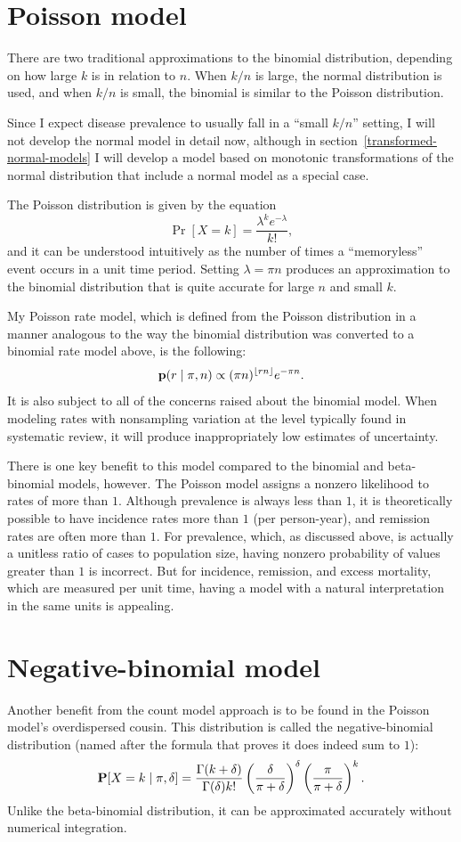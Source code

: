 \section{Poisson model}
There are two traditional approximations to the binomial distribution,
depending on how large $k$ is in relation to $n$.  When $k/n$ is
large, the normal distribution is used, and when $k/n$ is small, the
binomial is similar to the Poisson distribution.

Since I expect disease prevalence to usually fall in a ``small $k/n$''
setting, I will not develop the normal model in detail now, although
in section~\ref{transformed-normal-models} I will develop a model based on monotonic
transformations of the normal distribution that include a normal
model as a special case.

The Poisson distribution is given by the equation
\[
\Pr[X=k] =
\frac{\lambda^k e^{-\lambda}}{k!},
\]
and it can be understood intuitively as the number of times a
``memoryless'' event occurs in a unit time period.  Setting $\lambda
=\pi n$ produces an approximation to the binomial distribution that
is quite accurate for large $n$ and small
$k$.

My Poisson rate model, which is defined from the Poisson distribution
in a manner analogous to the way the binomial distribution was
converted to a binomial rate model above, is the following:
\[
\mathbf{p}(r\;|\; \pi,n) \propto
(\pi n)^{\lfloor
  rn\rfloor} e^{-\pi n}.
\]
It is also subject to all of the concerns raised about the binomial
model.  When modeling rates with nonsampling variation at the level
typically found in systematic review, it will produce
inappropriately low estimates of uncertainty.

There is one key benefit to this model compared to the binomial and
beta-binomial models, however.  The Poisson model assigns a nonzero
likelihood to rates of more than $1$.  Although prevalence is always
less than $1$, it is theoretically possible to have incidence rates
more than $1$ (per person-year), and remission rates are often more
than $1$.  For prevalence, which, as discussed above, is actually a
unitless ratio of cases to population size, having nonzero probability
of values greater than $1$ is incorrect.  But for incidence,
remission, and excess mortality, which are measured per unit time,
having a model with a natural interpretation in the same units is
appealing.


\section{Negative-binomial model}
Another benefit from the count model approach is to be found in the
Poisson model's overdispersed cousin.  This distribution is called
the negative-binomial distribution (named after the formula that
proves it does indeed sum to $1$):
\[
\mathbf{P}[X = k\;|\; \pi, \delta] =
 \frac{\Gamma(k+\delta)}{\Gamma(\delta)k!} \left(\frac{\delta}{\pi+\delta}\right)^\delta \left(\frac{\pi}{\pi+\delta}\right)^k.
\]
Unlike the beta-binomial distribution, it can be approximated
accurately without numerical integration.

